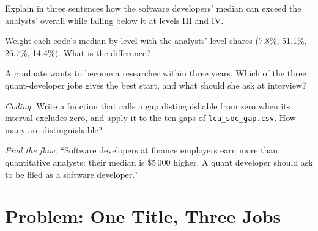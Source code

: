 \begin{exercise}[$\star\star$]\label{exo:in:quant-developer:4}
Explain in three sentences how the software developers' median can exceed the analysts' overall while falling below it at
levels III and IV.
\end{exercise}

\begin{exercise}[$\star\star$]\label{exo:in:quant-developer:5}
Weight each code's median by level with the analysts' level shares (7.8\%, 51.1\%, 26.7\%, 14.4\%). What is the
difference?
\end{exercise}

\begin{exercise}[$\star\star$]\label{exo:in:quant-developer:6}
A graduate wants to become a researcher within three years. Which of the three quant-developer jobs gives the best
start, and what should she ask at interview?
\end{exercise}

\begin{exercise}[$\star\star\star$]\label{exo:in:quant-developer:7}
\emph{Coding.} Write a function that calls a gap distinguishable from zero when its interval excludes zero, and apply it to
the ten gaps of \texttt{lca\_soc\_gap.csv}. How many are distinguishable?
\end{exercise}

\begin{exercise}[$\star\star\star$]\label{exo:in:quant-developer:8}
\emph{Find the flaw.} ``Software developers at finance employers earn more than quantitative analysts: their median is
\$5\,000 higher. A quant developer should ask to be filed as a software developer.''
\end{exercise}

\section{Problem: One Title, Three Jobs}

